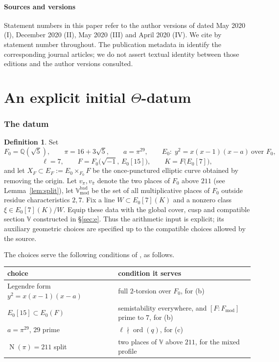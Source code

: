 \documentclass[11pt]{article}
\theoremstyle{plain}
\theoremstyle{definition}
\newtheorem{definition}[theorem]{Definition}
\newcommand{\Fmod}{F_{\mathrm{mod}}}
\newcommand{\Vbad}{\mathbb{V}^{\mathrm{bad}}}
\newcommand{\VV}{\mathbb{V}}
\newcommand{\ord}{\operatorname{ord}}
\newcommand{\Norm}{\operatorname{N}}
\begin{document}
\subsection{Sources and versions}

Statement numbers in this paper refer to the author versions of
\cite{IUT1,IUT2,IUT3,IUT4} dated May 2020 (I), December 2020 (II), May 2020
(III) and April 2020 (IV).  We cite by statement number throughout.
The publication metadata in \cite{IUTpub} identify the corresponding journal
articles; we do not assert textual identity between those editions and the
author versions consulted.

\part{An explicit initial \texorpdfstring{$\Theta$}{Theta}-datum}\label{part:datum}

\section{The datum}\label{sec:datum}

\begin{definition}\label{def:datum}
Set
\[
  F_0=\mathbb{Q}(\sqrt5),\qquad
  \pi=16+3\sqrt5,\qquad
  a=\pi^{29},\qquad
  E_0:\; y^2=x(x-1)(x-a)\ \text{over } F_0,
\]
\[
  \ell=7,\qquad
  F=F_0\bigl(\sqrt{-1},\,E_0[15]\bigr),\qquad
  K=F\bigl(E_0[7]\bigr),
\]
and let $X_F\subset E_F:=E_0\times_{F_0}F$ be the once-punctured elliptic curve
obtained by removing the origin.  Let $v_\pi,v_{\bar\pi}$ denote the two places
of $F_0$ above $211$ (see Lemma~\ref{lem:split}), let
$\Vbad_{\mathrm{mod}}$ be the set of all multiplicative places of $F_0$
outside residue characteristics $2,7$.  Fix a line $W\subset E_0[7](K)$ and a
nonzero class $\xi\in E_0[7](K)/W$.  Equip these data with the global cover,
cusp and compatible section $\VV$ constructed in \S\ref{sec:e}.
Thus the arithmetic input is explicit; its auxiliary geometric choices are
specified up to the compatible choices allowed by the source.
\end{definition}

The choices serve the following conditions of
\cite[Definition 3.1]{IUT1}, as follows.
\begin{center}
\begin{tabular}{p{.34\linewidth}p{.60\linewidth}}
\hline
choice & condition it serves\\
\hline
Legendre form $y^2=x(x-1)(x-a)$ & full $2$-torsion over $F_0$, for (b)\\
$E_0[15]\subset E_0(F)$ & semistability everywhere, and $[F{:}\Fmod]$ prime to $7$, for (b)\\
$a=\pi^{29}$, $29$ prime & $\ell\nmid\ord(q)$, for (c)\\
$\Norm(\pi)=211$ split & two places of $\VV$ above $211$, for the mixed profile\\
\hline
\end{tabular}
\end{center}
\end{document}
